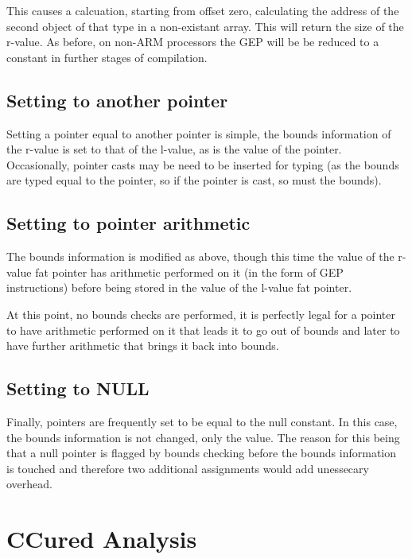 This causes a calcuation, starting from offset zero, calculating the address of the second object of that type in a non-existant array.
This will return the size of the r-value.
As before, on non-ARM processors the GEP will be be reduced to a constant in further stages of compilation.

\subsection{Setting to another pointer}

Setting a pointer equal to another pointer is simple, the bounds information of the r-value is set to that of the l-value, as is the value of the pointer.
Occasionally, pointer casts may be need to be inserted for typing (as the bounds are typed equal to the pointer, so if the pointer is cast, so must the bounds).

\subsection{Setting to pointer arithmetic}

The bounds information is modified as above, though this time the value of the r-value fat pointer has arithmetic performed on it (in the form of GEP instructions) before being stored in the value of the l-value fat pointer.

At this point, no bounds checks are performed, it is perfectly legal for a pointer to have arithmetic performed on it that leads it to go out of bounds and later to have further arithmetic that brings it back into bounds.

\subsection{Setting to NULL}

Finally, pointers are frequently set to be equal to the null constant.
In this case, the bounds information is not changed, only the value.
The reason for this being that a null pointer is flagged by bounds checking before the bounds information is touched and therefore two additional assignments would add unessecary overhead.

\section{CCured Analysis}


